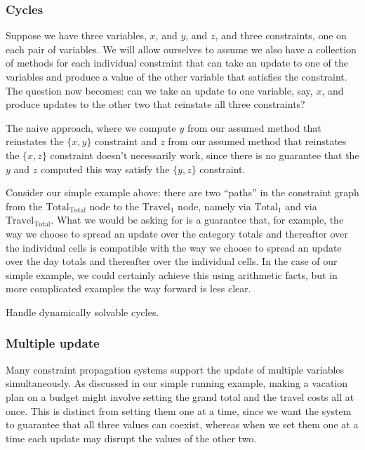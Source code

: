 \subsubsection{Cycles}
Suppose we have three variables, $x$, and $y$, and $z$, and three
constraints, one on each pair of variables. We will allow ourselves to
assume we also have a collection of methods for each individual constraint
that can take an update to one of the variables and produce a value of the
other variable that satisfies the constraint. The question now becomes: can
we take an update to one variable, say, $x$, and produce updates to the
other two that reinstate all three constraints?

The naive approach, where we compute $y$ from our assumed method that
reinstates the $\{x,y\}$ constraint and $z$ from our assumed method that
reinstates the $\{x,z\}$ constraint doesn't necessarily work, since there is
no guarantee that the $y$ and $z$ computed this way satisfy the $\{y,z\}$
constraint.

Consider our simple example above: there are two ``paths'' in the constraint
graph from the $\mathrm{Total}_\mathrm{Total}$ node to the
$\mathrm{Travel}_1$ node, namely via $\mathrm{Total}_1$ and via
$\mathrm{Travel}_\mathrm{Total}$. What we would be asking for is a guarantee
that, for example, the way we choose to spread an update over the category
totals and thereafter over the individual cells is compatible with the way
we choose to spread an update over the day totals and thereafter over the
individual cells. In the case of our simple example, we could certainly
achieve this using arithmetic facts, but in more complicated examples the
way forward is less clear.

\begin{desiderata}
    Handle dynamically solvable cycles.
\end{desiderata}

\subsubsection{Multiple update}
Many constraint propagation systems support the update of multiple variables
simultaneously. As discussed in our simple running example, making a
vacation plan on a budget might involve setting the grand total and the
travel costs all at once. This is distinct from setting them one at a time,
since we want the system to guarantee that all three values can coexist,
whereas when we set them one at a time each update may disrupt the values of
the other two.

